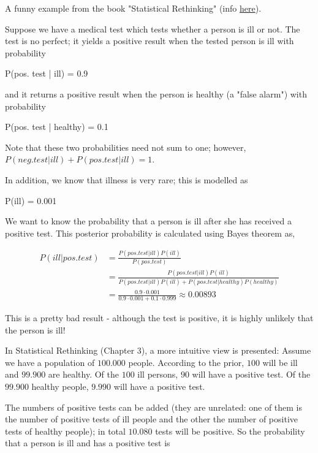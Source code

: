
A funny example from the book "Statistical Rethinking" (info \href{https://xcelab.net/rm/statistical-rethinking/}{here}).

Suppose we have a medical test which tests whether a person is ill or not. The test is no perfect; it yields a positive result when the tested person is ill with probability

\bee
P(pos. test | ill) = 0.9
\eee

and it returns a positive result when the person is healthy (a "false alarm") with probability

\bee
P(pos. test | healthy) = 0.1
\eee

Note that these two probabilities need not sum to one; however, $P(neg. test | ill) + P(pos. test | ill) = 1$.

In addition, we know that illness is very rare; this is modelled as

\bee
P(ill) = 0.001
\eee

We want to know the probability that a person is ill after she has received a positive test. This posterior probability is calculated using Bayes theorem as,

\begin{align*}
P(ill|pos. test) &= \frac{P(pos. test | ill) P(ill)}{P(pos. test)} \\ &= \frac{P(pos. test | ill) P(ill)}{P(pos. test|ill) P(ill) + P(pos. test | healthy) P(healthy)} \\ &= \frac{0.9 \cdot 0.001}{0.9 \cdot 0.001 + 0.1 \cdot 0.999} \approx 0.00893
\end{align*}

This is a pretty bad result - although the test is positive, it is highly unlikely that the person is ill!

In Statistical Rethinking (Chapter 3), a more intuitive view is presented: Assume we have a population of $100.000$ people. According to the prior, $100$ will be ill and $99.900$ are healthy. Of the $100$ ill persons, $90$ will have a positive test. Of the $99.900$ healthy people, $9.990$ will have a positive test.

The numbers of positive tests can be added (they are unrelated: one of them is the number of positive tests of ill people and the other the number of positive tests of healthy people); in total $10.080$ tests will be positive. So the probability that a person is ill and has a positive test is

